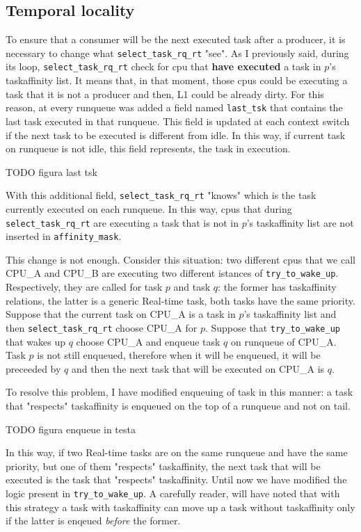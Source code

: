 \subsection{Temporal locality}

To ensure that a consumer will be the next executed task after a producer, it is necessary to change what \texttt{select\_task\_rq\_rt} "see". As I 
previously said, during its loop, \texttt{select\_task\_rq\_rt} check for cpu that \textbf{have executed} a task in $p$'s taskaffinity list. It means
that, in that moment, those cpus could be executing a task that it is not a producer and then, L1 could be already dirty. For this reason, at every 
runqueue was added a field named \texttt{last\_tsk} that contains the last task executed in that runqueue. This field is updated at each context switch 
if the next task to be executed is different from idle. In this way, if current task on runqueue is not idle, this field represents, the task in execution. 

TODO figura last tsk

With this additional field, \texttt{select\_task\_rq\_rt} "knows" which is the task currently executed on each runqueue. In this way, cpus that during 
\texttt{select\_task\_rq\_rt} are executing a task that is not in $p$'s taskaffinity list are not inserted in \texttt{affinity\_mask}.

This change is not enough. Consider this situation: two different cpus that we call CPU\_A and CPU\_B are executing two different istances of 
\texttt{try\_to\_wake\_up}. Respectively, they are called for task $p$ and task $q$: the former has taskaffinity relations, the latter is a generic 
Real-time task, both tasks have the same priority. Suppose that the current task on CPU\_A is a task in $p$'s taskaffinity list and then 
\texttt{select\_task\_rq\_rt} choose CPU\_A for $p$. Suppose that \texttt{try\_to\_wake\_up} that wakes up $q$ choose CPU\_A and enqueue task $q$ on 
runqueue of CPU\_A. Task $p$ is not still enqueued, therefore when it will be enqueued, it will be preceeded by $q$ and then the next task that will
be executed on CPU\_A is $q$.

To resolve this problem, I have modified enqueuing of task in this manner: a task that "respects" taskaffinity is enqueued on the top of a runqueue and not 
on tail. 

TODO figura enqueue in testa

In this way, if two Real-time tasks are on the same runqueue and have the same priority, but one of them "respects" taskaffinity, the next task that 
will be executed is the task that "respects" taskaffinity. Until now we have modified the logic present in \texttt{try\_to\_wake\_up}.
A carefully reader, will have noted that with this strategy a task with taskaffinity can move up a task without taskaffinity only if the latter is enqeued 
\textit{before} the former.

